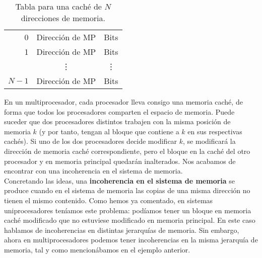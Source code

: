 \begin{table}
\centering
\begin{tabular}{r|c|c|}
    \cline{2-3}
    0 & Dirección de MP & Bits \\ \cline{2-3}
    1 & Dirección de MP & Bits \\ \cline{2-3}
      & \vdots & \vdots \\ \cline{2-3}
    $N-1$ & Dirección de MP & Bits \\ \cline{2-3}
\end{tabular}
\caption{Tabla para una caché de $N$ direcciones de memoria.}
\label{tab:tabla_cache}
\end{table}

En un multiprocesador, cada procesador lleva consigo una memoria caché, de forma que todos los procesadores comparten el espacio de memoria. Puede suceder que dos procesadores distintos trabajen con la misma posición de memoria $k$ (y por tanto, tengan al bloque que contiene a $k$ en sus respectivas cachés). Si uno de los dos procesadores decide modificar $k$, se modificará la dirección de memoria caché correspondiente, pero el bloque en la caché del otro procesador y en memoria principal quedarán inalterados. Nos acabamos de encontrar con una incoherencia en el sistema de memoria.\\

Concretando las ideas, una \textbf{incoherencia en el sistema de memoria} se produce cuando en el sistema de memoria las copias de una misma dirección no tienen el mismo contenido. Como hemos ya comentado, en sistemas uniprocesadores teníamos este problema: podíamos tener un bloque en memoria caché modificado que no estuviese modificado en memoria principal. En este caso hablamos de incoherencias en distintas jerarquías de memoria. Sin embargo, ahora en multiprocesadores podemos tener incoherencias en la misma jerarquía de memoria, tal y como mencionábamos en el ejemplo anterior.

